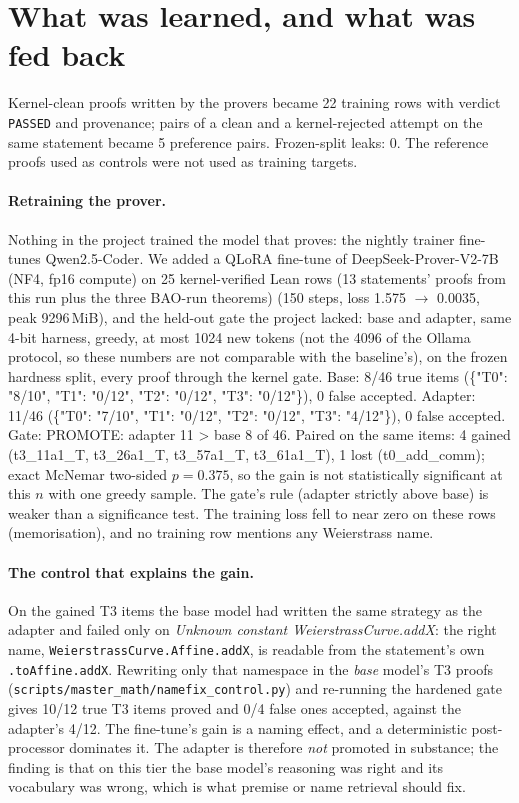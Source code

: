 \documentclass[11pt]{article}
\begin{document}
\section{What was learned, and what was fed back}
Kernel-clean proofs written by the provers became 22 training rows with verdict \texttt{PASSED} and provenance; pairs of a clean and a kernel-rejected attempt on the same statement became 5 preference pairs. Frozen-split leaks: 0. The reference proofs used as controls were not used as training targets. \paragraph{Retraining the prover.} Nothing in the project trained the model that proves: the nightly trainer fine-tunes Qwen2.5-Coder. We added a QLoRA fine-tune of DeepSeek-Prover-V2-7B (NF4, fp16 compute) on 25 kernel-verified Lean rows (13 statements' proofs from this run plus the three BAO-run theorems) (150 steps, loss 1.575 $\to$ 0.0035, peak 9296\,MiB), and the held-out gate the project lacked: base and adapter, same 4-bit harness, greedy, at most 1024 new tokens (not the 4096 of the Ollama protocol, so these numbers are not comparable with the baseline's), on the frozen hardness split, every proof through the kernel gate. Base: 8/46 true items (\{"T0": "8/10", "T1": "0/12", "T2": "0/12", "T3": "0/12"\}), 0 false accepted. Adapter: 11/46 (\{"T0": "7/10", "T1": "0/12", "T2": "0/12", "T3": "4/12"\}), 0 false accepted. Gate: PROMOTE: adapter 11 > base 8 of 46. Paired on the same items: 4 gained (t3\_11a1\_T, t3\_26a1\_T, t3\_57a1\_T, t3\_61a1\_T), 1 lost (t0\_add\_comm); exact McNemar two-sided $p = 0.375$, so the gain is not statistically significant at this $n$ with one greedy sample. The gate's rule (adapter strictly above base) is weaker than a significance test. The training loss fell to near zero on these rows (memorisation), and no training row mentions any Weierstrass name.

\paragraph{The control that explains the gain.} On the gained T3 items the base model had written the same strategy as the adapter and failed only on \emph{Unknown constant WeierstrassCurve.addX}: the right name, \texttt{WeierstrassCurve.Affine.addX}, is readable from the statement's own \texttt{.toAffine.addX}. Rewriting only that namespace in the \emph{base} model's T3 proofs (\texttt{scripts/master\_math/namefix\_control.py}) and re-running the hardened gate gives 10/12 true T3 items proved and 0/4 false ones accepted, against the adapter's 4/12. The fine-tune's gain is a naming effect, and a deterministic post-processor dominates it. The adapter is therefore \emph{not} promoted in substance; the finding is that on this tier the base model's reasoning was right and its vocabulary was wrong, which is what premise or name retrieval should fix.
\end{document}
